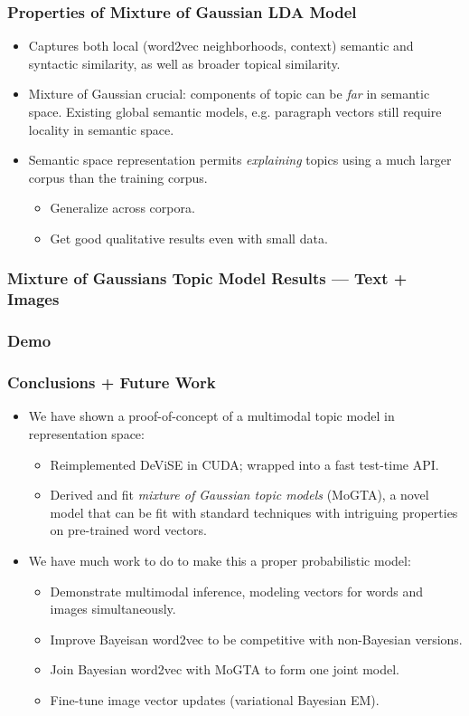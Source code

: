 \documentclass{beamer}
\begin{document}
\begin{frame}
  \frametitle{Properties of Mixture of Gaussian LDA Model}
  \begin{itemize}
    \item Captures both local (word2vec neighborhoods, context) semantic and syntactic similarity, as well as broader topical similarity.
    \item Mixture of Gaussian crucial: components of topic can be \emph{far} in semantic space. Existing global semantic models, e.g. paragraph vectors \citep{Le14q} still require locality in semantic space.
    \item Semantic space representation permits \emph{explaining} topics using a much larger corpus than the training corpus.
    \begin{itemize}
      \item Generalize across corpora.
      \item Get good qualitative results even with small data.
    \end{itemize}
        
  \end{itemize}

\end{frame}

\begin{frame}
  \frametitle{Mixture of Gaussians Topic Model Results --- Text + Images}
\end{frame}

\begin{frame}
  \frametitle{Demo}
\end{frame}

\begin{frame}
  \frametitle{Conclusions + Future Work}
  \begin{itemize}
    \item We have shown a proof-of-concept of a multimodal topic model in representation space:
    \begin{itemize}
      \item Reimplemented DeViSE in CUDA; wrapped into a fast test-time API.
      \item Derived and fit \emph{mixture of Gaussian topic models} (MoGTA), a novel model that can be fit with standard techniques with intriguing properties on pre-trained word vectors.
    \end{itemize}
    \item We have much work to do to make this a proper probabilistic model:
    \begin{itemize}
      \item Demonstrate multimodal inference, modeling vectors for words and images simultaneously.
      \item Improve Bayeisan word2vec to be competitive with non-Bayesian versions.
      \item Join Bayesian word2vec with MoGTA to form one joint model.
      \item Fine-tune image vector updates (variational Bayesian EM).
    \end{itemize}
  \end{itemize}
\end{frame}
\end{document}
